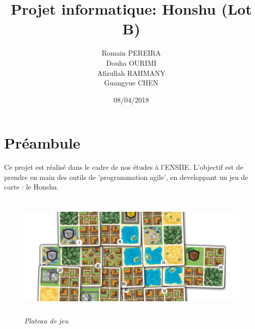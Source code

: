 \documentclass[10pt]{article}
\title{Projet informatique: Honshu (Lot B)}
\author{
  Romain PEREIRA\\
  Douha OURIMI\\
  Afizullah RAHMANY\\
  Guangyue CHEN
}
\date{08/04/2018}
\begin{document}
  \maketitle
  \tableofcontents
  
  \newpage
  \section*{Préambule}
  Ce projet est réalisé dans le cadre de nos études à l'ENSIIE.
  L'objectif est de prendre en main des outils de 'programmation agile',
  en developpant un jeu de carte : le Honshu.
  \newline
  \begin{figure}[H]
    \begin{center}
      \includegraphics[height=6cm,keepaspectratio]{../images/honshu.png}
    \end{center}
    \caption{\textit{Plateau de jeu}}
    \label{honshu_introduction}
  \end{figure}
  
\end{document}

